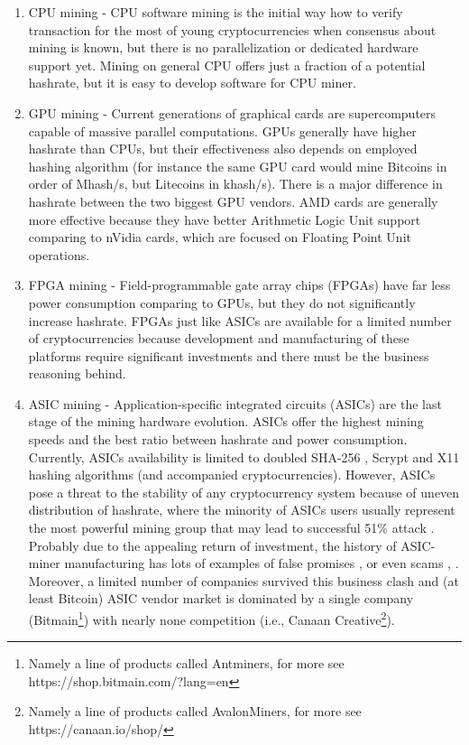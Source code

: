 \documentclass[preprint,12pt,3p]{elsarticle}
\begin{document}
\begin{enumerate}
    \item CPU mining - CPU software mining is the initial way how to verify transaction for the most of young cryptocurrencies when consensus about mining is known, but there is no parallelization or dedicated hardware support yet. Mining on general CPU offers just a fraction of a potential hashrate, but it is easy to develop software for CPU miner. 
    \item GPU mining - Current generations of graphical cards are supercomputers capable of massive parallel computations. GPUs generally have higher hashrate than CPUs, but their effectiveness also depends on employed hashing algorithm (for instance the same GPU card would mine Bitcoins in order of Mhash/s, but Litecoins in khash/s). There is a major difference in hashrate between the two biggest GPU vendors. AMD cards are generally more effective because they have better Arithmetic Logic Unit support comparing to nVidia cards, which are focused on Floating Point Unit operations.  
    \item FPGA mining - Field-programmable gate array chips (FPGAs) have far less power consumption comparing to GPUs, but they do not significantly increase hashrate. FPGAs just like ASICs are available for a limited number of cryptocurrencies because development and manufacturing of these platforms require significant investments and there must be the business reasoning behind.
    \item ASIC mining - Application-specific integrated circuits (ASICs) are the last stage of the mining hardware evolution. ASICs offer the highest mining speeds and the best ratio between hashrate and power consumption. Currently, ASICs availability is limited to doubled SHA-256 \cite{Anonymous2012SHS}, Scrypt \cite{rfc7914} and X11 \cite{DASHX11} hashing algorithms (and accompanied cryptocurrencies). However, ASICs pose a threat to the stability of any cryptocurrency system because of uneven distribution of hashrate, where the minority of ASICs users usually represent the most powerful mining group that may lead to successful 51\% attack \cite{COINDESK51}. Probably due to the appealing return of investment, the history of ASIC-miner manufacturing has lots of examples of false promises \cite{COINDESK-BFLAB}, \cite{COINDESK-COINTERRA} or even scams \cite{COINDESK-ALPHATECH}, \cite{COINDESK-BLACKARROW}. Moreover, a limited number of companies survived this business clash and (at least Bitcoin) ASIC vendor market is dominated by a single company (Bitmain\footnote{Namely a line of products called Antminers, for more see https://shop.bitmain.com/?lang=en}) with nearly none competition (i.e., Canaan Creative\footnote{Namely a line of products called AvalonMiners, for more see https://canaan.io/shop/}).

\end{enumerate}
\end{document}
